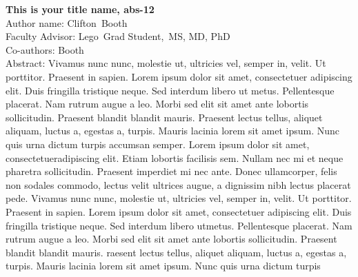 \documentclass[float=false, crop=false]{standalone}
\begin{document}
\textbf{This is your title name, abs-12}\\\noindent
Author name: Clifton~Booth \\\noindent
Faculty Advisor: Lego~Grad Student,~MS, MD, PhD\\\noindent
Co-authors: Booth \\\noindent
Abstract: Vivamus nunc nunc, molestie ut, ultricies vel, semper in, velit. Ut porttitor. Praesent in sapien. Lorem ipsum dolor sit amet, consectetuer adipiscing elit. Duis fringilla tristique neque. Sed interdum libero ut metus. Pellentesque placerat. Nam rutrum augue a leo. Morbi sed elit sit amet ante lobortis sollicitudin. Praesent blandit blandit mauris. Praesent lectus tellus, aliquet aliquam, luctus a, egestas a, turpis. Mauris lacinia lorem sit amet ipsum. Nunc quis urna dictum turpis accumsan semper. Lorem ipsum dolor sit amet, consectetueradipiscing elit. Etiam lobortis facilisis sem. Nullam nec mi et neque pharetra sollicitudin. Praesent imperdiet mi nec ante. Donec ullamcorper, felis non sodales commodo, lectus velit ultrices augue, a dignissim nibh lectus placerat pede. Vivamus nunc nunc, molestie ut, ultricies vel, semper in, velit. Ut porttitor. Praesent in sapien. Lorem ipsum dolor sit amet, consectetuer adipiscing elit. Duis fringilla tristique neque. Sed interdum libero utmetus. Pellentesque placerat. Nam rutrum augue a leo. Morbi sed elit sit amet ante lobortis sollicitudin. Praesent blandit blandit mauris. raesent lectus tellus, aliquet aliquam, luctus a, egestas a, turpis. Mauris lacinia lorem sit amet ipsum. Nunc quis urna dictum turpis\\\newline
\end{document}
